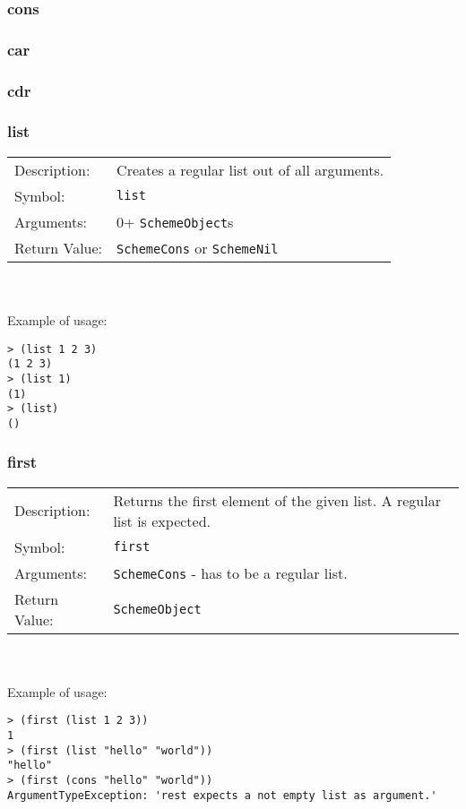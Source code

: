 \documentclass[12pt,a4paper]{scrartcl}
\begin{document}
\subsubsection*{cons}

\subsubsection*{car}
\subsubsection*{cdr}


\subsubsection*{list}
\begin{tabular}{l  p{13cm}}
Description: & Creates a regular list out of all arguments.\\
Symbol: & \lstinline{list}\\
Arguments: & 0+ \lstinline{SchemeObject}s\\
Return Value: & \lstinline{SchemeCons} or \lstinline{SchemeNil}
\end{tabular}
\\
\\
Example of usage:
\begin{lstlisting}
> (list 1 2 3)
(1 2 3)
> (list 1)
(1)
> (list)
()
\end{lstlisting}


\subsubsection*{first}
\begin{tabular}{l  p{13cm}}
Description: & Returns the first element of the given list. A regular list is expected.\\
Symbol: & \lstinline{first}\\
Arguments: & \lstinline{SchemeCons} - has to be a regular list.\\
Return Value: & \lstinline{SchemeObject}
\end{tabular}
\\
\\
Example of usage:
\begin{lstlisting}
> (first (list 1 2 3))
1
> (first (list "hello" "world"))
"hello"
> (first (cons "hello" "world"))
ArgumentTypeException: 'rest expects a not empty list as argument.' 
\end{lstlisting}
\end{document}
